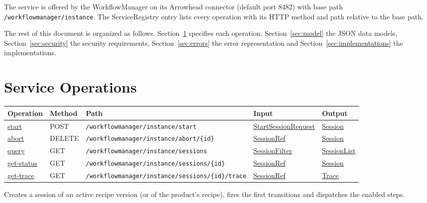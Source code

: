 \documentclass[a4paper]{arrowhead}
\newcommand{\mref}[1]{{\textcolor{ArrowheadPurple}{\hyperref[sec:model:#1]{#1}}}}
\newcommand{\oref}[1]{{\textcolor{ArrowheadBlue}{\hyperref[sec:operations:#1]{#1}}}}
\begin{document}
The service is offered by the WorkflowManager on its Arrowhead connector (default port 8482) with base path \texttt{/\allowbreak{}workflowmanager/\allowbreak{}instance}.
The ServiceRegistry entry lists every operation with its HTTP method and path relative to the base path.

The rest of this document is organized as follows. Section~\ref{sec:operations} specifies each operation,
Section~\ref{sec:model} the JSON data models, Section~\ref{sec:security} the security requirements,
Section~\ref{sec:errors} the error representation and Section~\ref{sec:implementations} the implementations.

\newpage
\section{Service Operations}
\label{sec:operations}

{\small
\begin{longtable}{|p{3.0cm}|p{1.5cm}|p{5.3cm}|p{3.0cm}|p{3.0cm}|}

\hline
\rowcolor{gray!33} Operation & Method & Path & Input & Output \\ \hline
\endhead
\oref{start} & POST & \texttt{/\allowbreak{}workflowmanager/\allowbreak{}instance/\allowbreak{}start} & \mref{StartSessionRequest} & \mref{Session} \\ \hline
\oref{abort} & DELETE & \texttt{/\allowbreak{}workflowmanager/\allowbreak{}instance/\allowbreak{}abort/\allowbreak{}\{id\}} & \mref{SessionRef} & \mref{Session} \\ \hline
\oref{query} & GET & \texttt{/\allowbreak{}workflowmanager/\allowbreak{}instance/\allowbreak{}sessions} & \mref{SessionFilter} & \mref{SessionList} \\ \hline
\oref{get-status} & GET & \texttt{/\allowbreak{}workflowmanager/\allowbreak{}instance/\allowbreak{}sessions/\allowbreak{}\{id\}} & \mref{SessionRef} & \mref{Session} \\ \hline
\oref{get-trace} & GET & \texttt{/\allowbreak{}workflowmanager/\allowbreak{}instance/\allowbreak{}sessions/\allowbreak{}\{id\}/\allowbreak{}trace} & \mref{SessionRef} & \mref{Trace} \\ \hline
\end{longtable}
}

Creates a session of an active recipe version (or of the product's recipe), fires the first transitions and dispatches the enabled steps.
\end{document}
